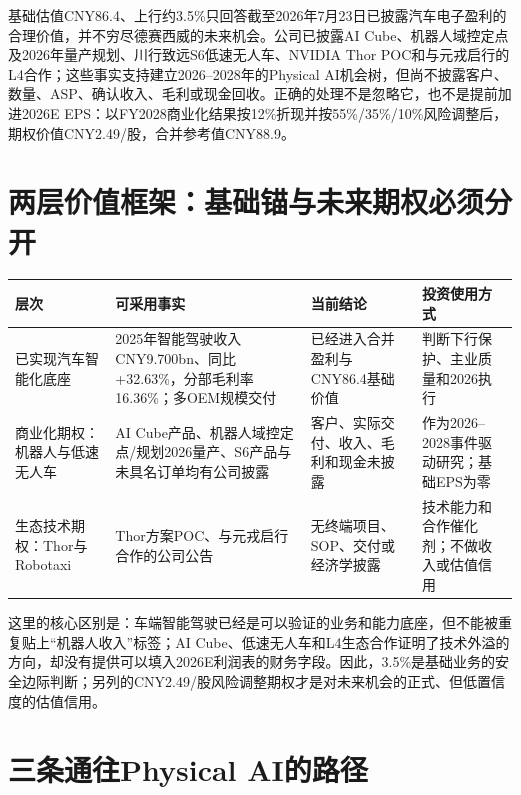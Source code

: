\begin{keyinsight}
基础估值CNY86.4、上行约3.5\%只回答截至2026年7月23日已披露汽车电子盈利的合理价值，并不穷尽德赛西威的未来机会。公司已披露AI Cube、机器人域控定点及2026年量产规划、川行致远S6低速无人车、NVIDIA Thor POC和与元戎启行的L4合作；这些事实支持建立2026--2028年的Physical AI机会树，但尚不披露客户、数量、ASP、确认收入、毛利或现金回收。正确的处理不是忽略它，也不是提前加进2026E EPS：以FY2028商业化结果按12\%折现并按55\%/35\%/10\%风险调整后，期权价值CNY2.49/股，合并参考值CNY88.9。
\end{keyinsight}

\section{两层价值框架：基础锚与未来期权必须分开}

\begin{exhibitbox}[德赛西威的两层价值]
\small
\begin{tabularx}{\textwidth}{L{2.2cm}Y Y Y}
\toprule
层次 & 可采用事实 & 当前结论 & 投资使用方式 \\
\midrule
已实现汽车智能化底座 & 2025年智能驾驶收入CNY9.700bn、同比+32.63\%，分部毛利率16.36\%；多OEM规模交付 & 已经进入合并盈利与CNY86.4基础价值 & 判断下行保护、主业质量和2026执行 \\
商业化期权：机器人与低速无人车 & AI Cube产品、机器人域控定点/规划2026量产、S6产品与未具名订单均有公司披露 & 客户、实际交付、收入、毛利和现金未披露 & 作为2026--2028事件驱动研究；基础EPS为零 \\
生态技术期权：Thor与Robotaxi & Thor方案POC、与元戎启行合作的公司公告 & 无终端项目、SOP、交付或经济学披露 & 技术能力和合作催化剂；不做收入或估值信用 \\
\bottomrule
\end{tabularx}
\end{exhibitbox}

这里的核心区别是：车端智能驾驶已经是可以验证的业务和能力底座，但不能被重复贴上“机器人收入”标签；AI Cube、低速无人车和L4生态合作证明了技术外溢的方向，却没有提供可以填入2026E利润表的财务字段。因此，3.5\%是基础业务的安全边际判断；另列的CNY2.49/股风险调整期权才是对未来机会的正式、但低置信度的估值信用。

\section{三条通往Physical AI的路径}

